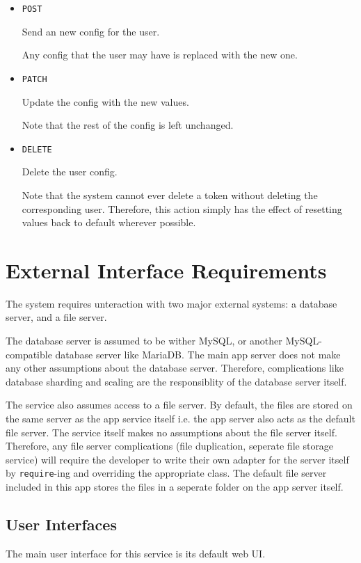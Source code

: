 \documentclass[12pt,a4paper]{report}
\begin{document}
\begin{itemize}
\begin{itemize}
		      \item \texttt{POST}

		            Send an new config for the user.

		            Any config that the user may have is replaced with the new one.

		      \item \texttt{PATCH}

		            Update the config with the new values.

		            Note that the rest of the config is left unchanged.

		      \item \texttt{DELETE}

		            Delete the user config.

		            Note that the system cannot ever delete a token without deleting the corresponding user.
		            Therefore, this action simply has the effect of resetting values back to default wherever possible.
	      \end{itemize}
\end{itemize}

\section{External Interface Requirements}\label{sec:external_interface_requirements}
The system requires unteraction with two major external systems: a database server, and a file server.

The database server is assumed to be wither MySQL, or another MySQL-compatible database server like MariaDB.
The main app server does not make any other assumptions about the database server.
Therefore, complications like database sharding and scaling are the responsiblity of the database server itself.

The service also assumes access to a file server.
By default, the files are stored on the same server as the app service itself i.e. the app server also acts as the default file server.
The service itself makes no assumptions about the file server itself.
Therefore, any file server complications (file duplication, seperate file storage service) will require the developer to write their own adapter for the server itself by \texttt{require}-ing and overriding the appropriate class.
The default file server included in this app stores the files in a seperate folder on the app server itself.
\subsection{User Interfaces}
The main user interface for this service is its default web UI.
\end{document}
